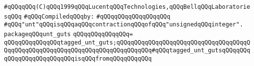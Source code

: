 \label{src/lib/std/src/bind-unt-guts.pkg}
\verb|#qQQqqQQq(C)qQQq1999qQQqLucentqQQqTechnologies,qQQqBellqQQqLaboratoriesqQQq|\newline
\newline
\verb|#qQQqCompiledqQQqby:|\newline
\verb|#qQQqqQQqqQQqqQQqqQQq|\newline
\newline
\verb|#qQQq"unt"qQQqisqQQqaqQQqcontractionqQQqofqQQq"unsignedqQQqinteger".|\newline
\newline
\verb|packageqQQqunt_guts|\newline
\verb|qQQqqQQqqQQqqQQq=|\newline
\verb|qQQqqQQqqQQqqQQqtagged_unt_guts;qQQqqQQqqQQqqQQqqQQqqQQqqQQqqQQqqQQqqQQqqQQqqQQqqQQqqQQqqQQqqQQqqQQqqQQqqQQqqQQq#qQQqtagged_unt_gutsqQQqqQQqqQQqqQQqqQQqqQQqqQQqisqQQqfromqQQqqQQqqQQq|\newline
\newline

